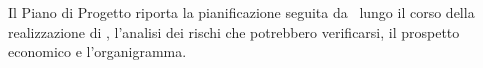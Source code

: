 Il Piano di Progetto riporta la pianificazione seguita da \gruppo\ lungo il corso della realizzazione di \progetto,
l'analisi dei rischi che potrebbero verificarsi, il prospetto economico e l'organigramma.
